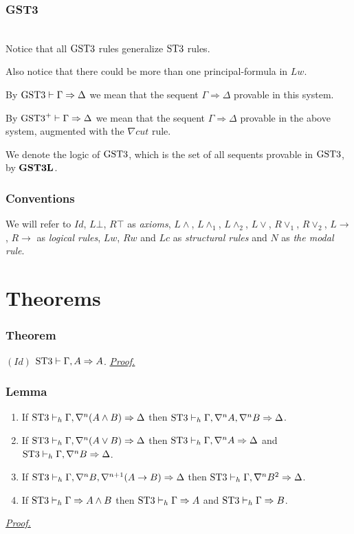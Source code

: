 \documentclass[a4paper, 12pt]{paper}
\begin{document}
\section{GST3} \quad \\



Notice that all $\text{GST3}$ rules generalize $\text{ST3}$ rules.

Also notice that there could be more than one principal-formula in $Lw$.

By $\text{GST3} \vdash \Gamma \Rightarrow \Delta$ we mean that the sequent $\Gamma \Rightarrow \Delta$ provable in this system.

By $\text{GST3}^+ \vdash \Gamma \Rightarrow \Delta$ we mean that the sequent $\Gamma \Rightarrow \Delta$ provable in the above system, augmented with the $\nabla cut$ rule.

We denote the logic of $\text{GST3}$, which is the set of all sequents provable in $\text{GST3}$, by $\mathbf{GST3L}$.


\section{Conventions} We will refer to $Id$, $L \bot$, $R \top$ as \emph{axioms}, $L \wedge$, $L \wedge_1$, $L \wedge_2$, $L \vee$, $R \vee_1$, $R \vee_2$, $L \rightarrow$, $R \rightarrow$ as \emph{logical rules}, $Lw$, $Rw$ and $Lc$ as \emph{structural rules} and $N$ as \emph{the modal rule}.


\pagebreak

\part*{Theorems}
\setcounter{section}{0}


\section{Theorem}\label{thm:stt-id-form} $(Id)$ $\text{ST3} \vdash \Gamma, A \Rightarrow A$. \hyperref[pr:stt-id-form]{\emph{Proof.}}


\section{Lemma}\label{lem:stt-inversion}
\begin{enumerate}
  \item If $\text{ST3} \vdash_h \Gamma, \nabla^n (A \wedge B) \Rightarrow \Delta$ then $\text{ST3} \vdash_h \Gamma, \nabla^n A, \nabla^n B \Rightarrow \Delta$.
  \item If $\text{ST3} \vdash_h \Gamma, \nabla^n (A \vee B) \Rightarrow \Delta$ then $\text{ST3} \vdash_h \Gamma, \nabla^n A \Rightarrow \Delta$ and $\text{ST3} \vdash_h \Gamma, \nabla^n B \Rightarrow \Delta$.
  \item If $\text{ST3} \vdash_h \Gamma, \nabla^n B, \nabla^{n+1} (A \rightarrow B) \Rightarrow \Delta$ then $\text{ST3} \vdash_h \Gamma, \nabla^n B^2 \Rightarrow \Delta$.
  \item If $\text{ST3} \vdash_h \Gamma \Rightarrow A \wedge B$ then $\text{ST3} \vdash_h \Gamma \Rightarrow A$ and $\text{ST3} \vdash_h \Gamma \Rightarrow B$.
\end{enumerate}
\hyperref[pr:stt-inversion]{\emph{Proof.}}
\end{document}
